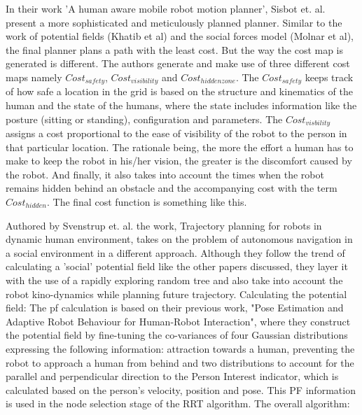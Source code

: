 In their work 'A human aware mobile robot motion planner', Sisbot et. al. present a more sophisticated and meticulously planned planner. Similar to the work of potential fields (Khatib et al) and the social forces model (Molnar et al), the final planner plans a path with the least cost. But the way the cost map is generated is different.
The authors generate and make use of three different cost maps namely $Cost_{safety}$, $Cost_{visibility}$ and $Cost_{hidden zone}$.
The $Cost_{safety}$ keeps track of how safe a location in the grid is based on the structure and kinematics of the human and the state of the humans, where the state includes information like the posture (sitting or standing), configuration and parameters.
The $Cost_{visbility}$ assigns a cost proportional to the ease of visibility of the robot to the person in that particular location. The rationale being, the more the effort a human has to make to keep the robot in his/her vision, the greater is the discomfort caused by the robot.
And finally, it also takes into account the times when the robot remains hidden behind an obstacle and the accompanying cost with the term $Cost_{hidden}$. The final cost function is something like this.

Authored by Svenstrup et. al. the work, Trajectory planning for robots in dynamic human environment, takes on the problem of autonomous navigation in a social environment in a different approach. Although they follow the trend of calculating a 'social' potential field like the other papers discussed, they layer it with the use of a rapidly exploring random tree and also take into account the robot kino-dynamics while planning future trajectory.
Calculating the potential field:
The pf calculation is based on their previous work, "Pose Estimation and Adaptive Robot Behaviour for Human-Robot Interaction", where they construct the potential field by fine-tuning the co-variances of four Gaussian distributions expressing the following information: attraction towards a human, preventing the robot to approach a human from behind and two distributions to account for the parallel and perpendicular direction to the Person Interest indicator, which is calculated based on the person's velocity, position and pose.  
This PF information is used in the node selection stage of the RRT algorithm.
The overall algorithm:

